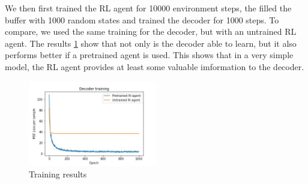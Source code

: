 \documentclass[a4paper]{scrartcl}
\begin{document}
  We then first trained the RL agent for 10000 environment steps, the filled the
  buffer with 1000 random states and trained the decoder for 1000 steps. To
  compare, we used the same training for the decoder, but with an untrained RL
  agent. The results \ref{fig:train_results} show that not only is the decoder able to learn, but it
  also performs better if a pretrained agent is used. This shows that in a very
  simple model, the RL agent provides at least some valuable imformation to the
  decoder.

  \begin{figure}[H]
    \centering
    \includegraphics[width=0.5\textwidth]{training_results.jpg}
    \caption{Training results}
    \label{fig:train_results}
\end{figure}
\end{document}
